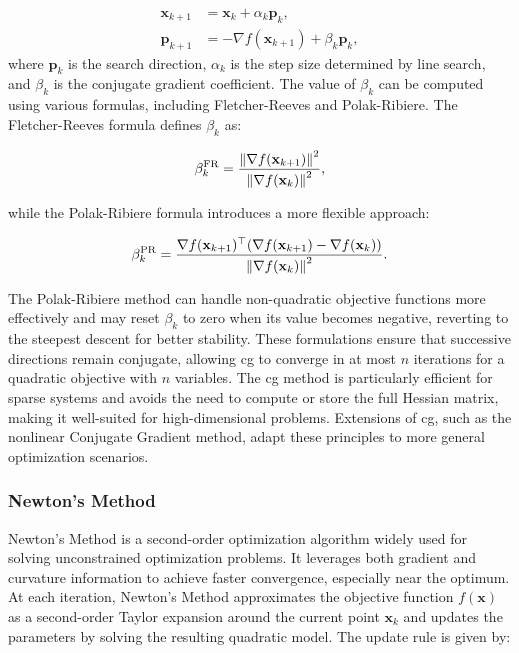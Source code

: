 \begin{align*}
\mathbf{x}_{k+1} &= \mathbf{x}_k + \alpha_k \mathbf{p}_k, \\
\mathbf{p}_{k+1} &= -\nabla f(\mathbf{x}_{k+1}) + \beta_k \mathbf{p}_k,
\end{align*}
where $\mathbf{p}_k$ is the search direction, $\alpha_k$ is the step size determined by line search, and $\beta_k$ is the conjugate gradient coefficient. The value of $\beta_k$ can be computed using various formulas, including Fletcher-Reeves and Polak-Ribiere. The Fletcher-Reeves formula defines $\beta_k$ as:

\begin{equation*}
\beta_k^{\text{FR}} = \frac{\norm{\nabla f(\mathbf{x}_{k+1})}^2}{\norm{\nabla f(\mathbf{x}_k)}^2},
\end{equation*}

\noindent while the Polak-Ribiere formula introduces a more flexible approach:

\begin{equation*}
\beta_k^{\text{PR}} = \frac{\nabla f(\mathbf{x}_{k+1})^\top (\nabla f(\mathbf{x}_{k+1}) - \nabla f(\mathbf{x}_k))}{\norm{\nabla f(\mathbf{x}_k)}^2}.
\end{equation*}

\noindent The Polak-Ribiere method can handle non-quadratic objective functions more effectively and may reset $\beta_k$ to zero when its value becomes negative, reverting to the steepest descent for better stability. These formulations ensure that successive directions remain conjugate, allowing \ac{cg} to converge in at most $n$ iterations for a quadratic objective with $n$ variables. The \ac{cg} method is particularly efficient for sparse systems and avoids the need to compute or store the full Hessian matrix, making it well-suited for high-dimensional problems. Extensions of \ac{cg}, such as the nonlinear Conjugate Gradient method, adapt these principles to more general optimization scenarios.

\subsubsection{Newton's Method}
\label{subsubsection:newtons_method}
Newton's Method is a second-order optimization algorithm widely used for solving unconstrained optimization problems. It leverages both gradient and curvature information to achieve faster convergence, especially near the optimum. At each iteration, Newton's Method approximates the objective function $f(\mathbf{x})$ as a second-order Taylor expansion around the current point $\mathbf{x}_k$ and updates the parameters by solving the resulting quadratic model. The update rule is given by:

